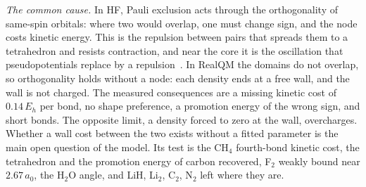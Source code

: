 \documentclass[11pt]{article}
\begin{document}
\emph{The common cause.} In HF, Pauli exclusion acts through the orthogonality of same-spin orbitals:
where two would overlap, one must change sign, and the node costs kinetic energy. This is the repulsion
between pairs that spreads them to a tetrahedron and resists contraction, and near the core it is the
oscillation that pseudopotentials replace by a repulsion~\cite{pk}. In RealQM the domains do not overlap,
so orthogonality holds without a node: each density ends at a free wall, and the wall is not charged. The
measured consequences are a missing kinetic cost of $0.14\,E_h$ per bond, no shape preference, a
promotion energy of the wrong sign, and short bonds. The opposite limit, a density forced to zero at the
wall, overcharges. Whether a wall cost between the two exists without a fitted parameter is the main open
question of the model. Its test is the CH$_4$ fourth-bond kinetic cost, the tetrahedron and the promotion
energy of carbon recovered, F$_2$ weakly bound near $2.67\,a_0$, the H$_2$O angle, and LiH, Li$_2$,
C$_2$, N$_2$ left where they are.
\end{document}
